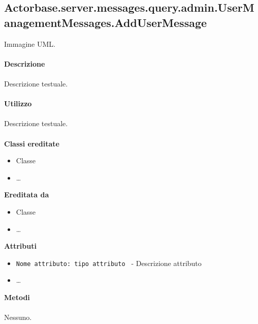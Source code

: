 \documentclass[a4paper]{article}
\begin{document}
	\subsection{Actorbase.server.messages.query.admin.UserManagementMessages.AddUserMessage}
		Immagine UML.
		\\ \\
		\textbf{Descrizione}
			\\ \\
			Descrizione testuale.
			\\ \\
		\textbf{Utilizzo}
			\\ \\
			Descrizione testuale.
			\\ \\
		\textbf{Classi ereditate}
			\begin{itemize}
				\item Classe
				\item \dots
			\end{itemize}
		\textbf{Ereditata da}
			\begin{itemize}
				\item Classe
				\item \dots
			\end{itemize}
		\textbf{Attributi}
			\begin{itemize}
				\item \texttt{Nome attributo: tipo attributo } - Descrizione attributo
				\item \dots
			\end{itemize}
		\textbf{Metodi}
			\\ \\
			Nessuno.		
			
\end{document}
